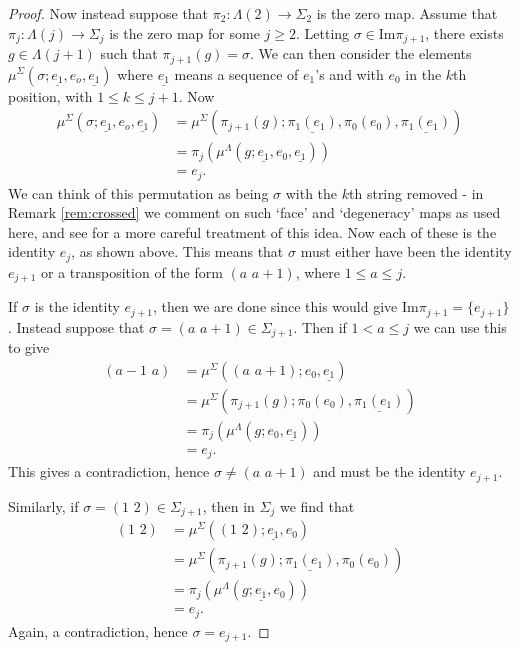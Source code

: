 \documentclass{amsbook} %
\newcommand{\trans}[2]{( #1 \, \, #2 )}
\numberwithin{section}{chapter}
\begin{document}
\begin{proof}
Now instead suppose that $\pi_2 \colon \Lambda(2) \rightarrow \Sigma_2$ is the zero map. Assume that $\pi_j \colon \Lambda(j) \rightarrow \Sigma_j$ is the zero map for some $j \geq 2$. Letting $\sigma \in \textrm{Im}\pi_{j+1}$, there exists $g \in \Lambda(j+1)$ such that $\pi_{j+1}(g) = \sigma$. We can then consider the elements $\mu^\Sigma(\sigma; \underline{e_1}, e_o, \underline{e_1})$ where $\underline{e_1}$ means a sequence of $e_1$'s and with $e_0$ in the $k$th position, with $1 \leq k \leq j + 1$. Now
  \begin{align*}
    \mu^\Sigma(\sigma; \underline{e_1}, e_o, \underline{e_1}) &= \mu^\Sigma(\pi_{j+1}(g); \underline{\pi_1(e_1)}, \pi_0(e_0), \underline{\pi_1(e_1)}) \\
    &= \pi_j(\mu^\Lambda(g; \underline{e_1}, e_0, \underline{e_1})) \\
    &= e_j.
  \end{align*}
We can think of this permutation as being $\sigma$ with the $k$th string removed - in Remark \ref{rem:crossed} we comment on such `face' and `degeneracy' maps as used here, and see \cite{ber-simplicial} for a more careful treatment of this idea. Now each of these is the identity $e_j$, as shown above. This means that $\sigma$ must either have been the identity $e_{j+1}$ or a transposition of the form $\trans{a}{a+1}$, where $1 \leq a \leq j$.

If $\sigma$ is the identity $e_{j+1}$, then we are done since this would give $\textrm{Im}\pi_{j+1} = \{e_{j+1}\}$. Instead suppose that $\sigma = \trans{a}{a+1} \in \Sigma_{j + 1}$. Then if $1 < a \leq j$ we can use this to give
  \begin{align*}
    \trans{a-1}{a} &= \mu^\Sigma(\trans{a}{a+1}; e_0, \underline{e_1}) \\
    &= \mu^\Sigma(\pi_{j+1}(g);\pi_0(e_0), \underline{\pi_1(e_1)}) \\
    &= \pi_j(\mu^\Lambda(g; e_0, \underline{e_1})) \\
    &= e_j.
  \end{align*}
This gives a contradiction, hence $\sigma \neq \trans{a}{a+1}$ and must be the identity $e_{j+1}$.

Similarly, if $\sigma = \trans{1}{2} \in \Sigma_{j+1}$, then in $\Sigma_j$ we find that
  \begin{align*}
    \trans{1}{2} &= \mu^\Sigma(\trans{1}{2} ; \underline{e_1}, e_0) \\
    &= \mu^\Sigma(\pi_{j+1}(g); \underline{\pi_1(e_1)}, \pi_0(e_0)) \\
    &= \pi_j(\mu^\Lambda(g ; \underline{e_1}, e_0)) \\
    &= e_j.
  \end{align*}
Again, a contradiction, hence $\sigma = e_{j+1}$.
\end{proof}
\end{document}
